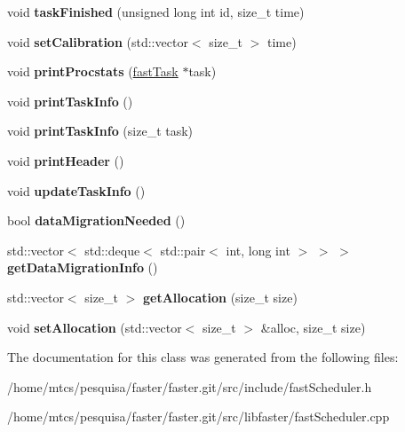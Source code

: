 \begin{DoxyCompactItemize}
void {\bfseries task\+Finished} (unsigned long int id, size\+\_\+t time)
\item 
\hypertarget{classfaster_1_1fastScheduler_a4d2aec030cd131b05c7091921545b3a4}{}\label{classfaster_1_1fastScheduler_a4d2aec030cd131b05c7091921545b3a4} 
void {\bfseries set\+Calibration} (std\+::vector$<$ size\+\_\+t $>$ time)
\item 
\hypertarget{classfaster_1_1fastScheduler_a17a44cb80cf026772647d5226ed56fcb}{}\label{classfaster_1_1fastScheduler_a17a44cb80cf026772647d5226ed56fcb} 
void {\bfseries print\+Procstats} (\hyperlink{classfaster_1_1fastTask}{fast\+Task} $\ast$task)
\item 
\hypertarget{classfaster_1_1fastScheduler_a426b97359b035f696ea99b0ce65ed781}{}\label{classfaster_1_1fastScheduler_a426b97359b035f696ea99b0ce65ed781} 
void {\bfseries print\+Task\+Info} ()
\item 
\hypertarget{classfaster_1_1fastScheduler_a93a5bb37ea8bc6a8d601dd01a2ed736b}{}\label{classfaster_1_1fastScheduler_a93a5bb37ea8bc6a8d601dd01a2ed736b} 
void {\bfseries print\+Task\+Info} (size\+\_\+t task)
\item 
\hypertarget{classfaster_1_1fastScheduler_a6c4b825db8c979eafead42e321e95d05}{}\label{classfaster_1_1fastScheduler_a6c4b825db8c979eafead42e321e95d05} 
void {\bfseries print\+Header} ()
\item 
\hypertarget{classfaster_1_1fastScheduler_a0c91feaec23646ee84e1fa530fe7cccf}{}\label{classfaster_1_1fastScheduler_a0c91feaec23646ee84e1fa530fe7cccf} 
void {\bfseries update\+Task\+Info} ()
\item 
\hypertarget{classfaster_1_1fastScheduler_a650ace70f7cb64835674cd67a5f605ca}{}\label{classfaster_1_1fastScheduler_a650ace70f7cb64835674cd67a5f605ca} 
bool {\bfseries data\+Migration\+Needed} ()
\item 
\hypertarget{classfaster_1_1fastScheduler_a181ea8d42d461ffd16785f77b4d6b416}{}\label{classfaster_1_1fastScheduler_a181ea8d42d461ffd16785f77b4d6b416} 
std\+::vector$<$ std\+::deque$<$ std\+::pair$<$ int, long int $>$ $>$ $>$ {\bfseries get\+Data\+Migration\+Info} ()
\item 
\hypertarget{classfaster_1_1fastScheduler_a47394267a9a85f9747a483a43cf6a650}{}\label{classfaster_1_1fastScheduler_a47394267a9a85f9747a483a43cf6a650} 
std\+::vector$<$ size\+\_\+t $>$ {\bfseries get\+Allocation} (size\+\_\+t size)
\item 
\hypertarget{classfaster_1_1fastScheduler_a6a691cada9432d0054a2dfefbe1fc9a3}{}\label{classfaster_1_1fastScheduler_a6a691cada9432d0054a2dfefbe1fc9a3} 
void {\bfseries set\+Allocation} (std\+::vector$<$ size\+\_\+t $>$ \&alloc, size\+\_\+t size)
\end{DoxyCompactItemize}


The documentation for this class was generated from the following files\+:\begin{DoxyCompactItemize}
\item 
/home/mtcs/pesquisa/faster/faster.\+git/src/include/fast\+Scheduler.\+h\item 
/home/mtcs/pesquisa/faster/faster.\+git/src/libfaster/fast\+Scheduler.\+cpp\end{DoxyCompactItemize}
